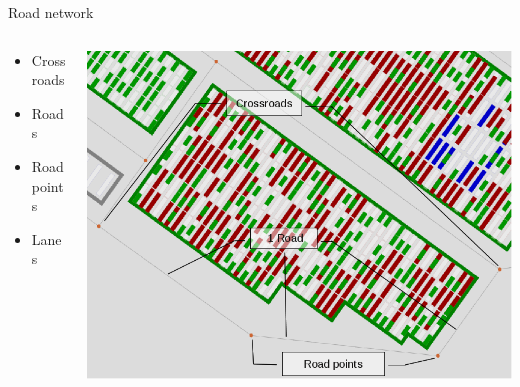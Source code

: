 \documentclass{beamer}
\begin{document}
  \begin{frame}{Road network}
\begin{columns}
    \begin{column}[l]{4.0cm}	
	\begin{itemize}
	  \item Crossroads
	  \item Roads
	  \item Road points
	  \item Lanes
	\end{itemize}
    \end{column}
    \begin{column}[r]{6.5cm}
	\begin{flushright}
	  \includegraphics[height=.55\textheight]{fig/FigRoadPoints.png}
	\end{flushright}
    \end{column}
 \end{columns}	
    
 \end{frame}
\end{document}
